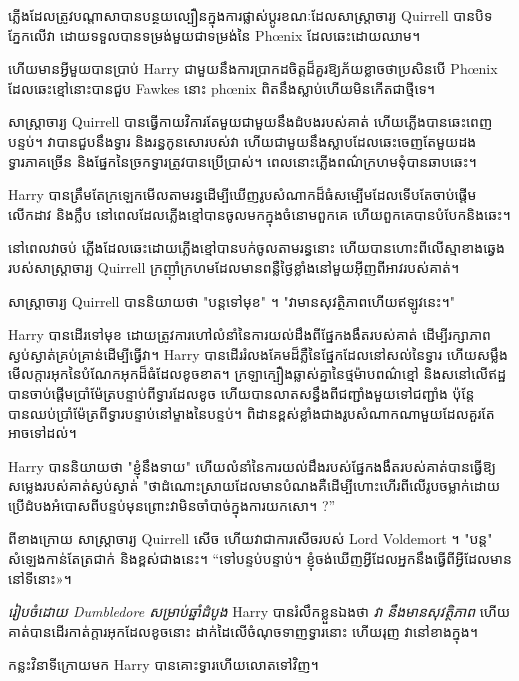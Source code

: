 ភ្លើង​ដែល​ត្រូវ​បណ្តាសា​បាន​បន្ថយ​ល្បឿន​ក្នុង​ការ​ផ្លាស់​ប្តូរ​ខណៈ​ដែល​សាស្ត្រាចារ្យ Quirrell បាន​បិទ​ភ្នែក​លើ​វា ដោយ​ទទួល​បាន​ទម្រង់​មួយ​ជា​ទម្រង់​នៃ Phœnix ដែល​ឆេះ​ដោយ​ឈាម។

ហើយមានអ្វីមួយបានប្រាប់ Harry ជាមួយនឹងការប្រាកដចិត្តដ៏គួរឱ្យភ័យខ្លាចថាប្រសិនបើ Phœnix ដែលឆេះខ្មៅនោះបានជួប Fawkes នោះ phœnix ពិតនឹងស្លាប់ហើយមិនកើតជាថ្មីទេ។

សាស្ត្រាចារ្យ Quirrell បានធ្វើកាយវិការតែមួយជាមួយនឹងដំបងរបស់គាត់ ហើយភ្លើងបានឆេះពេញបន្ទប់។ វាបានជួបនឹងទ្វារ និងរន្ធកូនសោរបស់វា ហើយជាមួយនឹងស្លាបដែលឆេះចេញតែមួយដង ទ្វារភាគច្រើន និងផ្នែកនៃច្រកទ្វារត្រូវបានប្រើប្រាស់។ ពេលនោះ​ភ្លើង​ពណ៌​ក្រហម​ទុំ​បាន​ឆាបឆេះ​។

Harry បានត្រឹមតែក្រឡេកមើលតាមរន្ធដើម្បីឃើញរូបសំណាកដ៏ធំសម្បើមដែលទើបតែចាប់ផ្តើមលើកដាវ និងក្លឹប នៅពេលដែលភ្លើងខ្មៅបានចូលមកក្នុងចំនោមពួកគេ ហើយពួកគេបានបំបែកនិងឆេះ។

នៅពេលវាចប់ ភ្លើងដែលឆេះដោយភ្លើងខ្មៅបានបក់ចូលតាមរន្ធនោះ ហើយបានហោះពីលើស្មាខាងឆ្វេងរបស់សាស្រ្តាចារ្យ Quirrell ក្រញ៉ាំក្រហមដែលមានពន្លឺថ្ងៃខ្លាំងនៅមួយអ៊ីញពីអាវរបស់គាត់។

សាស្រ្តាចារ្យ Quirrell បាននិយាយថា "បន្តទៅមុខ" ។ "វាមានសុវត្ថិភាពហើយឥឡូវនេះ។"

Harry បានដើរទៅមុខ ដោយត្រូវការហៅលំនាំនៃការយល់ដឹងពីផ្នែកងងឹតរបស់គាត់ ដើម្បីរក្សាភាពស្ងប់ស្ងាត់គ្រប់គ្រាន់ដើម្បីធ្វើវា។ Harry បាន​ដើរ​រំលង​គែម​ដ៏​ភ្លឺ​នៃ​ផ្នែក​ដែល​នៅ​សល់​នៃ​ទ្វារ ហើយ​សម្លឹង​មើល​ក្តារ​អុក​នៃ​បំណែក​អុក​ដ៏​ធំ​ដែល​ខូច​ខាត។ ក្រឡាក្បឿងឆ្លាស់គ្នានៃថ្មម៉ាបពណ៌ខ្មៅ និងសនៅលើឥដ្ឋបានចាប់ផ្តើមប្រាំម៉ែត្របន្ទាប់ពីទ្វារដែលខូច ហើយបានលាតសន្ធឹងពីជញ្ជាំងមួយទៅជញ្ជាំង ប៉ុន្តែបានឈប់ប្រាំម៉ែត្រពីទ្វារបន្ទាប់នៅម្ខាងនៃបន្ទប់។ ពិដាន​ខ្ពស់​ខ្លាំង​ជាង​រូបសំណាក​ណា​មួយ​ដែល​គួរ​តែ​អាច​ទៅ​ដល់។

Harry បាននិយាយថា "ខ្ញុំនឹងទាយ" ហើយលំនាំនៃការយល់ដឹងរបស់ផ្នែកងងឹតរបស់គាត់បានធ្វើឱ្យសម្លេងរបស់គាត់ស្ងប់ស្ងាត់ "ថាដំណោះស្រាយដែលមានបំណងគឺដើម្បីហោះហើរពីលើរូបចម្លាក់ដោយប្រើដំបងអំបោសពីបន្ទប់មុនព្រោះវាមិនចាំបាច់ក្នុងការយកសោ។ ?”

ពីខាងក្រោយ សាស្ត្រាចារ្យ Quirrell សើច ហើយវាជាការសើចរបស់ Lord Voldemort ។ "បន្ត" សំឡេងកាន់តែត្រជាក់ និងខ្ពស់ជាងនេះ។ “ទៅបន្ទប់បន្ទាប់។ ខ្ញុំ​ចង់​ឃើញ​អ្វី​ដែល​អ្នក​នឹង​ធ្វើ​ពី​អ្វី​ដែល​មាន​នៅ​ទីនោះ»។

\emph{រៀបចំដោយ Dumbledore សម្រាប់ឆ្នាំដំបូង} Harry បានរំលឹកខ្លួនឯងថា \emph{វា \emph{នឹង}មានសុវត្ថិភាព} ហើយគាត់បានដើរកាត់ក្តារអុកដែលខូចនោះ ដាក់ដៃលើចំណុចទាញទ្វារនោះ ហើយរុញ វានៅខាងក្នុង។

\later

កន្លះ​វិនាទី​ក្រោយ​មក Harry បាន​គោះ​ទ្វារ​ហើយ​លោត​ទៅ​វិញ។

